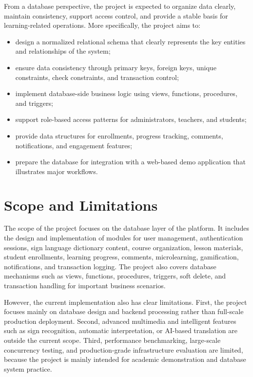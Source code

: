 From a database perspective, the project is expected to organize data clearly, maintain consistency, support access control, and provide a stable basis for learning-related operations. More specifically, the project aims to:
\begin{itemize}
    \item design a normalized relational schema that clearly represents the key entities and relationships of the system;
    \item ensure data consistency through primary keys, foreign keys, unique constraints, check constraints, and transaction control;
    \item implement database-side business logic using views, functions, procedures, and triggers;
    \item support role-based access patterns for administrators, teachers, and students;
    \item provide data structures for enrollments, progress tracking, comments, notifications, and engagement features;
    \item prepare the database for integration with a web-based demo application that illustrates major workflows.
\end{itemize}

\section{Scope and Limitations}
The scope of the project focuses on the database layer of the platform. It includes the design and implementation of modules for user management, authentication sessions, sign language dictionary content, course organization, lesson materials, student enrollments, learning progress, comments, microlearning, gamification, notifications, and transaction logging. The project also covers database mechanisms such as views, functions, procedures, triggers, soft delete, and transaction handling for important business scenarios.

However, the current implementation also has clear limitations. First, the project focuses mainly on database design and backend processing rather than full-scale production deployment. Second, advanced multimedia and intelligent features such as sign recognition, automatic interpretation, or AI-based translation are outside the current scope. Third, performance benchmarking, large-scale concurrency testing, and production-grade infrastructure evaluation are limited, because the project is mainly intended for academic demonstration and database system practice.


